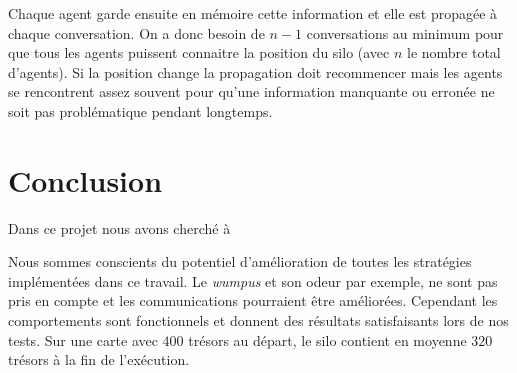 \documentclass[11pt]{article}
\begin{document}
Chaque agent garde ensuite en mémoire cette information et elle est propagée à chaque conversation. On a donc besoin de $n-1$ conversations au minimum pour que tous les agents puissent connaitre la position du silo (avec $n$ le nombre total d'agents). Si la position change la propagation doit recommencer mais les agents se rencontrent assez souvent pour qu'une information manquante ou erronée ne soit pas problématique pendant longtemps.
\section{Conclusion}

Dans ce projet nous avons cherché à 

Nous sommes conscients du potentiel d'amélioration de toutes les stratégies implémentées dans ce travail. Le \textit{wumpus} et son odeur par exemple, ne sont pas pris en compte et les communications pourraient être améliorées. Cependant les comportements sont fonctionnels et donnent des résultats satisfaisants lors de nos tests. Sur une carte avec $400$ trésors au départ, le silo contient en moyenne $320$ trésors à la fin de l'exécution.
\end{document}
